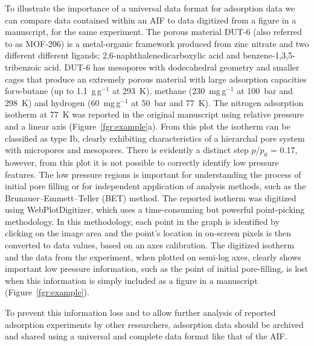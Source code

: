 \documentclass[journal=langd5,manuscript=article]{achemso}
\begin{document}
To illustrate the importance of a universal data format for adsorption data we can compare data contained within an AIF to data digitized from a figure in a manuscript, for the same experiment.
The porous material DUT-6 (also referred to as MOF-206) is a metal-organic framework produced from zinc nitrate and two different different ligands; 2,6-naphthalenedicarboxylic acid and benzene-1,3,5-tribenzoic acid.\cite{10.1002/anie.200904599}
DUT-6 has mesopores with dodecahedral geometry and smaller cages that produce an extremely porous material with large adsorption capacities for\textit{n}-butane (up to 1.1~g$\,$g$^{-1}$ at 293~K),  methane (230~mg$\,$g$^{-1}$ at 100~bar and 298~K) and hydrogen (60~mg$\,$g$^{-1}$ at 50~bar and 77~K).
The nitrogen adsorption isotherm at 77~K was reported in the original manuscript using relative pressure and a linear axis (Figure~\ref{fgr:example}a).
From this plot the isotherm can be classified  as  type  Ib, clearly exhibiting characteristics of a hierarchal pore system with micropores and mesopores.
There is evidently a distinct step $p/p_0$ = 0.17, however, from this plot it is not possible to correctly identify low pressure features.
The low pressure regions is important for understanding the process of initial pore filling or for independent application of analysis methods, such as the Brunauer–Emmett–Teller (BET) method.\cite{10.1016/S0167-2991(07)80008-5}
The reported isotherm was digitized using WebPlotDigitizer, which uses a time-consuming but powerful point-picking methodology.\cite{webplotdigitizer}
In this methodology, each point in the graph is identified by clicking on the image area and the point's location in on-screen pixels is then converted to data values, based on an axes calibration.
The digitized isotherm and the data from the experiment, when plotted on semi-log axes, clearly shows important low pressure information, such as the point of initial pore-filling, is lost when this information is simply included as a figure in a manuscript (Figure~\ref{fgr:example}).

To prevent this information loss and to allow further analysis of reported adsorption experiments by other researchers, adsorption data should be archived and shared using a universal and complete data format like that of the AIF.
\end{document}
